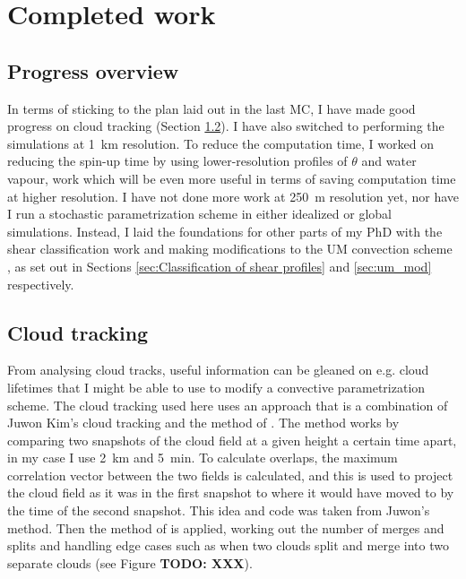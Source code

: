 \documentclass[11pt,a4paper]{article}
\newcommand\todo[1]{\textbf{TODO: #1}}
\begin{document}
\section{Completed work}
\label{sec:Completed work}

\subsection{Progress overview}
\label{sec:Progress overview}

In terms of sticking to the plan laid out in the last MC, I have made good progress on cloud tracking (Section \ref{sec:Cloud tracking}). I have also switched to performing the simulations at \SI{1}{km} resolution. To reduce the computation time, I worked on reducing the spin-up time by using lower-resolution profiles of $\theta$ and water vapour, work which will be even more useful in terms of saving computation time at higher resolution. I have not done more work at \SI{250}{m} resolution yet, nor have I run a stochastic parametrization scheme in either idealized or global simulations. Instead, I laid the foundations for other parts of my PhD with the shear classification work and making modifications to the UM convection scheme \parencite{gregory1990mass}, as set out in Sections \ref{sec:Classification of shear profiles} and \ref{sec:um_mod} respectively.

\subsection{Cloud tracking}
\label{sec:Cloud tracking}


From analysing cloud tracks, useful information can be gleaned on e.g. cloud lifetimes that I might be able to use to modify a convective parametrization scheme. The cloud tracking used here uses an approach that is a combination of Juwon Kim's cloud tracking and the method of \cite{plant2009statistical}. 
The method works by comparing two snapshots of the cloud field at a given height a certain time apart, in my case I use \SI{2}{km} and \SI{5}{min}. To calculate overlaps, the maximum correlation vector between the two fields is calculated, and this is used to project the cloud field as it was in the first snapshot to where it would have moved to by the time of the second snapshot. This idea and code was taken from Juwon's method. Then the method of \cite{plant2009statistical} is applied, working out the number of merges and splits and handling edge cases such as when two clouds split and merge into two separate clouds (see Figure \todo{XXX}).
\end{document}
